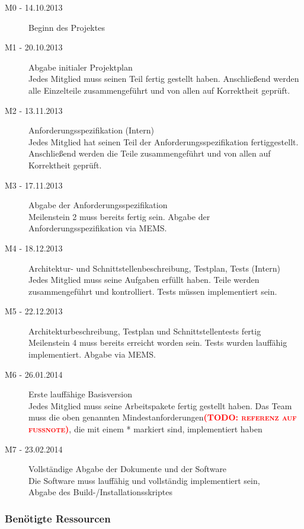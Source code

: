 \documentclass[fontsize=12pt,paper=a4,twoside]{scrartcl}
\newcommand{\todo}[1]{\textbf{\textsc{\textcolor{red}{(TODO: #1)}}}}
\begin{document}
\begin{description}
\item[M0 - 14.10.2013] Beginn des Projektes
\item[M1 - 20.10.2013] Abgabe initialer Projektplan\\
Jedes Mitglied muss seinen Teil fertig gestellt haben. Anschließend werden alle Einzelteile zusammengeführt und von allen auf Korrektheit geprüft.
\item[M2 - 13.11.2013] Anforderungsspezifikation (Intern) \\
Jedes Mitglied hat seinen Teil der Anforderungsspezifikation fertiggestellt. Anschließend werden die Teile zusammengeführt und von allen auf Korrektheit geprüft.
\item[M3 - 17.11.2013] Abgabe der Anforderungsspezifikation \\
Meilenstein 2 muss bereits fertig sein. Abgabe der Anforderungsspezifikation via MEMS.
\item[M4 - 18.12.2013] Architektur- und Schnittstellenbeschreibung, Testplan, Tests (Intern)\\
Jedes Mitglied muss seine Aufgaben erfüllt haben. Teile werden zusammengeführt und kontrolliert. Tests müssen implementiert sein.
\item[M5 - 22.12.2013] Architekturbeschreibung, Testplan und Schnittstellentests fertig\\
Meilenstein 4 muss bereits erreicht worden sein. Tests wurden lauffähig implementiert. Abgabe via MEMS.
\item[M6 - 26.01.2014] Erste lauffähige Basisversion\\
Jedes Mitglied muss seine Arbeitspakete fertig gestellt haben. Das Team muss die oben genannten Mindestanforderungen\todo{referenz auf fußnote}, die mit einem * markiert sind, implementiert haben
\item[M7 - 23.02.2014] Vollständige Abgabe der Dokumente und der Software \\
Die Software muss lauffähig und vollständig implementiert sein, \\
Abgabe des Build-/Installationsskriptes
\end{description}

\subsubsection{Benötigte Ressourcen}
\end{document}

